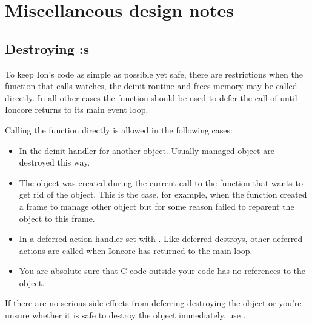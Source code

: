 \section{Miscellaneous design notes}

\subsection{Destroying :s}

To keep Ion's code as simple as possible yet safe, there are restrictions
when the 
function that calls watches, the deinit routine and frees memory may
be called directly. In all other cases the 
function should be used to defer the call of  until
Ioncore returns to its main event loop. 

Calling the  function directly is allowed in the
following cases:
\begin{itemize}
    \item In the deinit handler for another object. Usually managed object
      are destroyed this way.
    \item The object was created during the current call to the function
      that wants to get rid of the object. This is the case, for example,
      when the function created a frame to manage other object but for
      some reason failed to reparent the object to this frame.
    \item In a deferred action handler set with
      .
      Like deferred destroys, other deferred actions are called when
      Ioncore has returned to the main loop.
    \item You are absolute sure that C code outside your code has no
      references to the object.
\end{itemize}

If there are no serious side effects from deferring destroying the
object or you're unsure whether it is safe to destroy the object
immediately, use .
